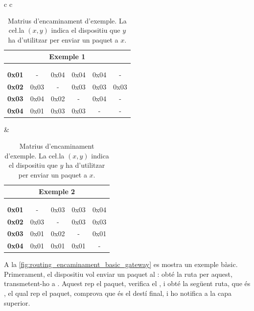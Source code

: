 \documentclass{tfgitic}[2024/07/01]
\begin{document}
{\begin{table}
    \centering
    \begin{tabular}{c c}
        \begin{tabular}{r|ccccc}
            \multicolumn{6}{c}{\small Exemple 1} \\
            \hline
            \multicolumn{1}{c|}{\vcell{}} & \vcell{\textbf{0x01}} & \vcell{\textbf{0x02}} & \vcell{\textbf{0x03}} & \vcell{\textbf{0x04}} & \vcell{\textbf{0x05}} \\[-\rowheight]
            \multicolumn{1}{c|}{\printcellmiddle} & \printcellbottom & \printcellbottom & \printcellbottom & \printcellbottom & \printcellbottom \\ 
            \hline
            \textbf{0x01} & - & 0x04 & 0x04 & 0x04 & - \\
            \textbf{0x02} & 0x03 & - & 0x03 & 0x03 & 0x03 \\
            \textbf{0x03} & 0x04 & 0x02 & - & 0x04 & - \\
            \textbf{0x04} & 0x01 & 0x03 & 0x03 & - & -
        \end{tabular}
        &
        \begin{tabular}{r|cccc}
            \multicolumn{5}{c}{\small Exemple 2} \\
            \hline
            \multicolumn{1}{c|}{\vcell{}} & \vcell{\textbf{0x01}} & \vcell{\textbf{0x02}} & \vcell{\textbf{0x03}} & \vcell{\textbf{0x04}} \\
            [-\rowheight]
            \multicolumn{1}{c|}{\printcellmiddle} & \printcellbottom & \printcellbottom & \printcellbottom & \printcellbottom  \\ 
            \hline
            \textbf{0x01} & -    & 0x03 & 0x03 & 0x04 \\
            \textbf{0x02} & 0x03 & -    & 0x03 & 0x03 \\
            \textbf{0x03} & 0x01 & 0x02 & -    & 0x01 \\
            \textbf{0x04} & 0x01 & 0x01 & 0x01 & -
        \end{tabular}
    \end{tabular}
    \caption{Matrius d'encaminament d'exemple. La ce\l.la $(x, y)$ indica el dispositiu que $y$ ha d'utilitzar per enviar un paquet a $x$.}
    \label{tab:routing_taula_enc_exemples}
\end{table}


A la \autoref{fig:routing_encaminament_basic_gateway} es mostra un exemple bàsic. Primerament, el dispositiu  vol enviar un paquet al : obté la ruta per aquest, transmetent-ho a . Aquest rep el paquet, verifica el , i obté la següent ruta, que és , el qual rep el paquet, comprova que és el destí final, i ho notifica a la capa superior. 

}
\end{document}
